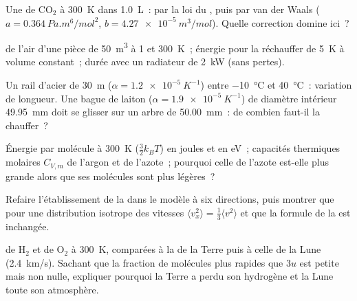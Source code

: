 \begin{exercise}[$\star\star$]\label{exo:b1:kinetic-theory:7}
Une  de CO$_2$ à \qty{300}{K} dans \qty{1.0}{L}~:  par la loi
du , puis par van der Waals ($a = \qty{0.364}{Pa.m^6/mol^2}$,
$b = \qty{4.27e-5}{m^3/mol}$). Quelle correction domine ici~?
\end{exercise}

\begin{exercise}[$\star\star$]\label{exo:b1:kinetic-theory:8}
 de l'air d'une pièce de \qty{50}{m^3} à \qty{1}{} et
\qty{300}{K}~; énergie pour la réchauffer de \qty{5}{K} à volume
constant~; durée avec un radiateur de \qty{2}{kW} (sans pertes).
\end{exercise}

\begin{exercise}[$\star\star$]\label{exo:b1:kinetic-theory:9}
Un rail d'acier de \qty{30}{m} ($\alpha = \qty{1.2e-5}{K^{-1}}$) entre
\qty{-10}{\degreeCelsius} et \qty{40}{\degreeCelsius}~: variation de
longueur. Une bague de laiton ($\alpha = \qty{1.9e-5}{K^{-1}}$) de
diamètre intérieur \qty{49.95}{mm} doit se glisser sur un arbre de
\qty{50.00}{mm}~: de combien faut-il la chauffer~?
\end{exercise}

\begin{exercise}[$\star\star\star$]\label{exo:b1:kinetic-theory:10}
Énergie par molécule à \qty{300}{K} ($\tfrac32 k_BT$) en joules et en eV~;
capacités thermiques molaires $C_{V,m}$ de l'argon et de l'azote~;
pourquoi celle de l'azote est-elle plus grande alors que ses molécules
sont plus légères~?
\end{exercise}

\begin{exercise}[$\star\star\star$]\label{exo:b1:kinetic-theory:11}
Refaire l'établissement de la  dans le modèle à six
directions, puis montrer que pour une distribution isotrope des vitesses $\langle v_x^2\rangle
= \tfrac13\langle v^2\rangle$ et que la formule de la  est inchangée.
\end{exercise}

\begin{exercise}[$\star\star\star$]\label{exo:b1:kinetic-theory:12}
 de H$_2$ et de O$_2$ à \qty{300}{K},
comparées à la  de la Terre puis à celle de la Lune
(\qty{2.4}{km/s}). Sachant que la fraction de molécules plus rapides que
$3u$ est petite mais non nulle, expliquer pourquoi la Terre a perdu son
hydrogène et la Lune toute son atmosphère.
\end{exercise}

